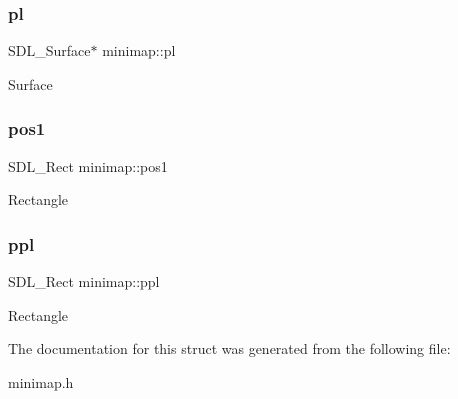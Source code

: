\subsubsection{\texorpdfstring{pl}{pl}}
{\footnotesize\ttfamily S\+D\+L\+\_\+\+Surface$\ast$ minimap\+::pl}

Surface \mbox{\label{structminimap_a40bafd4b39aa3bc4ac940a42b384005c}} 
\subsubsection{\texorpdfstring{pos1}{pos1}}
{\footnotesize\ttfamily S\+D\+L\+\_\+\+Rect minimap\+::pos1}

Rectangle \mbox{\label{structminimap_a33921f629e99a7f31dcfc4c4e58e6fe2}} 
\subsubsection{\texorpdfstring{ppl}{ppl}}
{\footnotesize\ttfamily S\+D\+L\+\_\+\+Rect minimap\+::ppl}

Rectangle 

The documentation for this struct was generated from the following file\+:\begin{DoxyCompactItemize}
\item 
minimap.\+h\end{DoxyCompactItemize}

